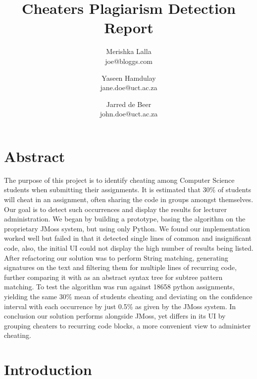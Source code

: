 \documentclass[11pt,a4paper]{article}
\begin{document}
\title{Cheaters Plagiarism Detection Report} \date{}
\author{Merishka Lalla\\joe@bloggs.com
\and Yaseen Hamdulay\\jane.doe@uct.ac.za
\and Jarred de Beer\\john.doe@uct.ac.za}

\chead{}
\lfoot{}
\cfoot{\thepage}    %
\rfoot{}
\renewcommand{\headrulewidth}{0.0pt}   %

\maketitle
\thispagestyle{plain}  %

\section*{Abstract}
The purpose of this project is to identify cheating among Computer Science
students when submitting their assignments. It is estimated that
30\% of students will cheat in an assignment, often sharing the code in groups amongst themselves.
 Our goal is to detect such occurrences and display the results for lecturer administration. 
We began by building a prototype, basing the algorithm on the proprietary JMoss system, 
but using only Python. We found our implementation worked well but failed in that it detected single lines 
of common and insignificant code, also, the initial UI could not display the high number of results
being listed. After refactoring our solution was to perform String matching, generating 
signatures on the text and filtering them for multiple lines of
recurring code, further comparing it with as an abstract syntax tree for subtree pattern matching. 
To test the algorithm was run against 18658 python assignments, yielding the same 30\% mean
of students cheating and deviating on the confidence interval with each occurrence by just 0.5\%
as given by the JMoss system. In conclusion our solution performs alongside JMoss, yet differs in its UI by
grouping cheaters to recurring code blocks, a more convenient view to administer cheating.

\section{Introduction}
\label{s:introduction}
\end{document}
